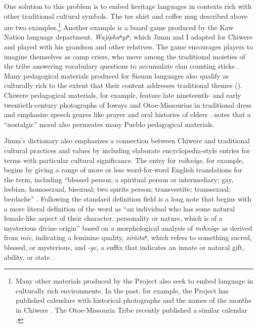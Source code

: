 \documentclass[output=paper]{LSP/langsci}
\begin{document}
One solution to this problem is to embed heritage languages in contexts rich with other traditional cultural symbols. The tee shirt and coffee mug described above are two examples.\footnote{Many other materials produced by the Project also seek to embed language in culturally rich environments. In the past, for example, the Project has published calendars with historical photographs and the names of the months in Chiwere \citep{Goodtracks1985}. The Otoe-Missouria Tribe recently published a similar calendar \citep{OtoeMissouriaLD2014}.}  Another example is a board game produced by the Kaw Nation language department, \emph{Wajíphaⁿyiⁿ}, which Jimm and I adapted for Chiwere and played with his grandson and other relatives. The game encourages players to imagine themselves as camp criers, who move among the traditional moieties of the tribe answering vocabulary questions to accumulate clan counting sticks \citep{KanzaLP2004}. Many pedagogical materials produced for Siouan languages also qualify as culturally rich to the extent that their content addresses traditional themes (\citealt[e.g.][]{HartmannMarschke2010, KanzaLP2010}). Chiwere pedagogical materials, for example, feature late nineteenth- and early twentieth-century photographs of Ioways and Otoe-Missourias in traditional dress and emphasize speech genres like prayer and oral histories of elders \citep{OtoeIowaWistrandRobinson1977, OtoeIowaWistrandRobinson1978}.  notes that a ``nostalgic'' mood also permeates many Pueblo pedagogical materials.

Jimm's dictionary also emphasizes a connection between Chiwere and traditional cultural practices and values by including elaborate encyclopedia-style entries for terms with particular cultural significance. The entry for \emph{mihxóge}, for example, begins by giving a range of more or less word-for-word English translations for the term, including ``blessed person; a spiritual person or intermediary; gay, lesbian, homosexual, bisexual; two spirits person; transvestite; transsexual; berdache'' \citep[6]{Goodtracks2008}. Following the standard definition field is a long note that begins with a more literal definition of the word as ``an individual who has some natural female-like aspect of their character, personality or nature, which is of a mysterious divine origin'' based on a morphological analysis of \emph{mihxóge} as derived from \emph{mie}, indicating a feminine quality, \emph{xóñitaⁿ}, which refers to something sacred, blessed, or mysterious, and -\emph{ge}, a suffix that indicates an innate or natural gift, ability, or state \citep[6]{Goodtracks2008}.
\end{document}
